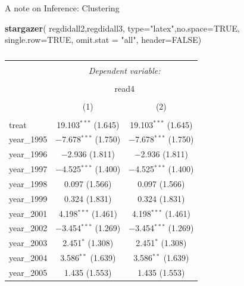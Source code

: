 \documentclass[
  ignorenonframetext,
]{beamer}
\newenvironment{Shaded}{\begin{snugshade}}{\end{snugshade}}
\newcommand{\AttributeTok}[1]{\textcolor[rgb]{0.13,0.29,0.53}{#1}}
\newcommand{\ConstantTok}[1]{\textcolor[rgb]{0.56,0.35,0.01}{#1}}
\newcommand{\FunctionTok}[1]{\textcolor[rgb]{0.13,0.29,0.53}{\textbf{#1}}}
\newcommand{\NormalTok}[1]{#1}
\newcommand{\StringTok}[1]{\textcolor[rgb]{0.31,0.60,0.02}{#1}}
\begin{document}
\begin{frame}[fragile]{A note on Inference: Clustering}
\protect\hypertarget{a-note-on-inference-clustering-2}{}
\tiny

\begin{Shaded}
\begin{Highlighting}[]
\FunctionTok{stargazer}\NormalTok{( regdidall2,regdidall3, }\AttributeTok{type=}\StringTok{"latex"}\NormalTok{,}\AttributeTok{no.space=}\ConstantTok{TRUE}\NormalTok{, }\AttributeTok{single.row=}\ConstantTok{TRUE}\NormalTok{, }\AttributeTok{omit.stat =} \StringTok{"all"}\NormalTok{, }\AttributeTok{header=}\ConstantTok{FALSE}\NormalTok{)}
\end{Highlighting}
\end{Shaded}

\begin{table}[!htbp] \centering 
  \caption{} 
  \label{} 
\begin{tabular}{@{\extracolsep{5pt}}lcc} 
\\[-1.8ex]\hline 
\hline \\[-1.8ex] 
 & \multicolumn{2}{c}{\textit{Dependent variable:}} \\ 
\cline{2-3} 
\\[-1.8ex] & \multicolumn{2}{c}{read4} \\ 
\\[-1.8ex] & (1) & (2)\\ 
\hline \\[-1.8ex] 
 treat & 19.103$^{***}$ (1.645) & 19.103$^{***}$ (1.645) \\ 
  year\_1995 & $-$7.678$^{***}$ (1.750) & $-$7.678$^{***}$ (1.750) \\ 
  year\_1996 & $-$2.936 (1.811) & $-$2.936 (1.811) \\ 
  year\_1997 & $-$4.525$^{***}$ (1.400) & $-$4.525$^{***}$ (1.400) \\ 
  year\_1998 & 0.097 (1.566) & 0.097 (1.566) \\ 
  year\_1999 & 0.324 (1.831) & 0.324 (1.831) \\ 
  year\_2001 & 4.198$^{***}$ (1.461) & 4.198$^{***}$ (1.461) \\ 
  year\_2002 & $-$3.454$^{***}$ (1.269) & $-$3.454$^{***}$ (1.269) \\ 
  year\_2003 & 2.451$^{*}$ (1.308) & 2.451$^{*}$ (1.308) \\ 
  year\_2004 & 3.586$^{**}$ (1.639) & 3.586$^{**}$ (1.639) \\ 
  year\_2005 & 1.435 (1.553) & 1.435 (1.553) \\ 

\end{tabular}
\end{table}
\end{frame}
\end{document}
